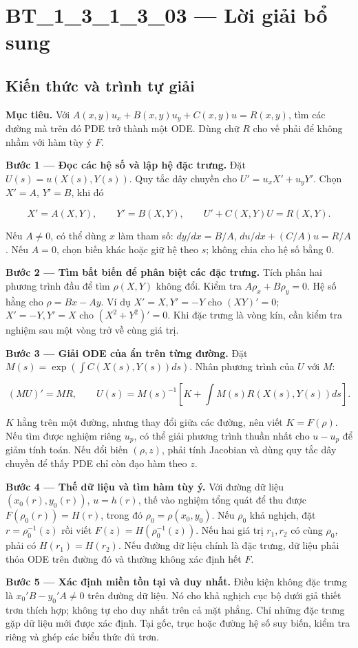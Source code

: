 \documentclass[10pt,a4paper]{article}
\begin{document}
\section*{BT\_1\_3\_1\_3\_03 — Lời giải bổ sung}
\subsection*{Kiến thức và trình tự giải}
\textbf{Mục tiêu.} Với $A(x,y)u_x+B(x,y)u_y+C(x,y)u=R(x,y)$, tìm các đường mà trên đó PDE trở thành một ODE. Dùng chữ $R$ cho vế phải để không nhầm với hàm tùy ý $F$.

\textbf{Bước 1 — Đọc các hệ số và lập hệ đặc trưng.} Đặt $U(s)=u(X(s),Y(s))$. Quy tắc dây chuyền cho $U'=u_xX'+u_yY'$. Chọn $X'=A$, $Y'=B$, khi đó

\[
X'=A(X,Y),\qquad Y'=B(X,Y),\qquad U'+C(X,Y)U=R(X,Y).
\]

Nếu $A\ne0$, có thể dùng $x$ làm tham số: $dy/dx=B/A$, $du/dx+(C/A)u=R/A$. Nếu $A=0$, chọn biến khác hoặc giữ hệ theo $s$; không chia cho hệ số bằng 0.

\textbf{Bước 2 — Tìm bất biến để phân biệt các đặc trưng.} Tích phân hai phương trình đầu để tìm $\rho(X,Y)$ không đổi. Kiểm tra $A\rho_x+B\rho_y=0$. Hệ số hằng cho $\rho=Bx-Ay$. Ví dụ $X'=X,Y'=-Y$ cho $(XY)'=0$; $X'=-Y,Y'=X$ cho $(X^2+Y^2)'=0$. Khi đặc trưng là vòng kín, cần kiểm tra nghiệm sau một vòng trở về cùng giá trị.

\textbf{Bước 3 — Giải ODE của ẩn trên từng đường.} Đặt $M(s)=\exp(\int C(X(s),Y(s))ds)$. Nhân phương trình của $U$ với $M$:

\[
(MU)'=MR,\qquad
U(s)=M(s)^{-1}\left[K+\int M(s)R(X(s),Y(s))ds\right].
\]

$K$ hằng trên một đường, nhưng thay đổi giữa các đường, nên viết $K=F(\rho)$. Nếu tìm được nghiệm riêng $u_p$, có thể giải phương trình thuần nhất cho $u-u_p$ để giảm tính toán. Nếu đổi biến $(\rho,z)$, phải tính Jacobian và dùng quy tắc dây chuyền để thấy PDE chỉ còn đạo hàm theo $z$.

\textbf{Bước 4 — Thế dữ liệu và tìm hàm tùy ý.} Với đường dữ liệu $(x_0(r),y_0(r))$, $u=h(r)$, thế vào nghiệm tổng quát để thu được $F(\rho_0(r))=H(r)$, trong đó $\rho_0=\rho(x_0,y_0)$. Nếu $\rho_0$ khả nghịch, đặt $r=\rho_0^{-1}(z)$ rồi viết $F(z)=H(\rho_0^{-1}(z))$. Nếu hai giá trị $r_1,r_2$ có cùng $\rho_0$, phải có $H(r_1)=H(r_2)$. Nếu đường dữ liệu chính là đặc trưng, dữ liệu phải thỏa ODE trên đường đó và thường không xác định hết $F$.

\textbf{Bước 5 — Xác định miền tồn tại và duy nhất.} Điều kiện không đặc trưng là $x_0'B-y_0'A\ne0$ trên đường dữ liệu. Nó cho khả nghịch cục bộ dưới giả thiết trơn thích hợp; không tự cho duy nhất trên cả mặt phẳng. Chỉ những đặc trưng gặp dữ liệu mới được xác định. Tại gốc, trục hoặc đường hệ số suy biến, kiểm tra riêng và ghép các biểu thức đủ trơn.
\end{document}
